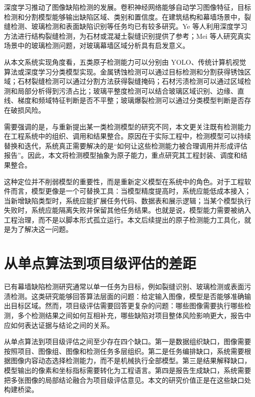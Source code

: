深度学习推动了图像缺陷检测的发展。卷积神经网络能够自动学习图像特征，目标检测和分割模型能够输出缺陷区域、类别和置信度\cite{article1,conf1}。在建筑结构和幕墙场景中，裂缝检测、玻璃检测和表面缺陷识别等任务均已有较多研究。Ye 等人利用深度学习方法进行结构裂缝检测，为石材或混凝土裂缝识别提供了参考\cite{ye2019crack}；Mei 等人研究真实场景中的玻璃检测问题，对玻璃幕墙区域分析具有启发意义\cite{mei2020glass}。

从本文系统实现角度看，五类原子检测能力可以分别由 YOLO、传统计算机视觉算法或深度学习分类模型实现。金属锈蚀检测可以通过目标检测和分割获得锈蚀区域；石材裂缝检测可以通过分割方法获得裂缝掩码；石材污渍检测可以通过区域检测和局部分析得到污渍占比；玻璃平整度检测可以结合玻璃区域识别、边缘、直线、梯度和频域特征判断是否不平整；玻璃爆裂检测可以通过分类模型判断是否存在破损风险。

需要强调的是，与重新提出某一类检测模型的研究不同，本文更关注既有检测能力在工程系统中的组织、调用和结果整合。原因在于实际工程中，检测模型可以持续替换和迭代，系统真正需要解决的是“如何让这些检测能力被合理调用并形成评估报告”。因此，本文将检测模型抽象为原子能力，重点研究其工程封装、调度和结果整合。

这种定位并不削弱模型的重要性，而是重新定义模型在系统中的角色。对于工程软件而言，模型更像是一个可替换工具：当模型精度提高时，系统应能低成本接入；当新增缺陷类型时，系统应能扩展任务代码、数据表和展示逻辑；当某个模型执行失败时，系统应能隔离失败并保留其他任务结果。也就是说，模型能力需要被纳入工程治理，而不是以脚本形式孤立运行。本文后续提出的原子检测能力工具化，就是为了解决这一问题。

\section{从单点算法到项目级评估的差距}
\label{sec:related-algorithm-to-system}

已有幕墙缺陷检测研究通常以单一任务为目标，例如裂缝识别、玻璃检测或表面污渍检测。这类研究能够回答算法层面的问题：给定输入图像，模型是否能够准确输出目标区域。然而，项目级评估需要回答更复杂的问题：哪些图像需要执行哪些检测，多个检测结果之间如何互相补充，哪些缺陷对项目整体风险影响更大，报告中应如何表达证据与结论之间的关系。

从单点算法到项目级评估之间至少存在四个缺口。第一是数据组织缺口，图像需要按照项目、图像组、图像和检测任务多层组织。第二是任务编排缺口，系统需要根据图像内容动态选择检测能力，而不是机械执行全部模型。第三是结果解释缺口，模型输出的像素和坐标指标需要转化为工程语言。第四是报告生成缺口，系统需要把多张图像的局部结论融合为项目级评估意见。本文的研究价值正是在这些缺口处构建桥梁。

